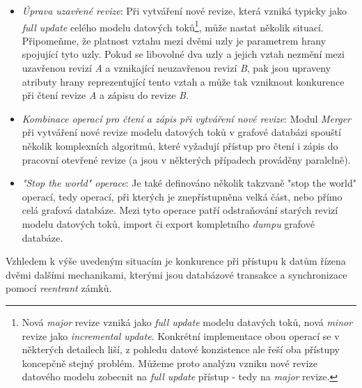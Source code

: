 \begin{itemize}
	\item{\textit{Úprava uzavřené revize}}: Při vytváření nové revize, která vzniká typicky jako \textit{full update} celého modelu datových toků\footnote{Nová \textit{major} revize vzniká jako \textit{full update} modelu datavých toků, nová \textit{minor} revize jako \textit{incremental update}. Konkrétní implementace obou operací se v některých detailech liší, z pohledu datové konzistence ale řeší oba přístupy koncepčně stejný problém. Můžeme proto analýzu vzniku nové revize datového modelu zobecnit na \textit{full update} přístup - tedy na \textit{major} revize.}, může nastat několik situací. Připomeňme, že platnost vztahu mezi dvěmi uzly je parametrem hrany spojující tyto uzly. Pokud se libovolné dva uzly a jejich vztah nezmění mezi uzavřenou revizí \textit{A} a vznikající neuzavřenou revizí \textit{B}, pak jsou upraveny atributy hrany reprezentující tento vztah a může tak vzniknout konkurence při čtení revize \textit{A} a zápisu do revize \textit{B}.
	\item{\textit{Kombinace operací pro čtení a zápis při vytváření nové revize}}: Modul \textit{Merger} při vytváření nové revize modelu datových toků v grafové databázi spouští několik komplexních algoritmů, které vyžadují přístup pro čtení i zápis do pracovní otevřené revize (a jsou v některých případech prováděny paralelně).
	\item{\textit{"Stop the world" operace}}: Je také definováno několik takzvaně "stop the world" operací, tedy operací, při kterých je znepřístupněna velká část, nebo přímo celá grafová databáze. Mezi tyto operace patří odstraňování starých revizí modelu datových toků, import či export kompletního \textit{dumpu} grafové databáze.
\end{itemize}

Vzhledem k výše uvedeným situacím je konkurence při přístupu k datům řízena dvěmi dalšími mechanikami, kterými jsou databázové transakce a synchronizace pomocí \textit{reentrant} zámků.

